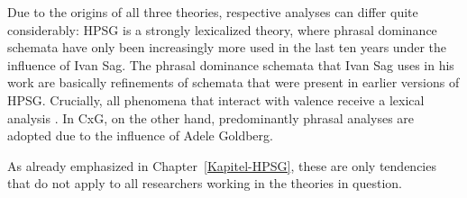 Due to the origins of all three theories, respective analyses can differ quite considerably: HPSG is a strongly lexicalized theory, where
phrasal dominance schemata have only been increasingly more used in the last ten years under the
influence of Ivan Sag. The phrasal dominance schemata that Ivan Sag uses in
his work are basically refinements of schemata that were present in earlier versions of
HPSG. Crucially, all phenomena that interact with valence receive a lexical analysis \citep*[Section~2.3]{SBK2012a}.
In CxG, on the other hand, predominantly phrasal analyses are adopted due to the influence of Adele
Goldberg.%

As already emphasized in Chapter~\ref{Kapitel-HPSG}, these are only tendencies that do not apply to all researchers working in the
theories in question.


\bigskip
{}

